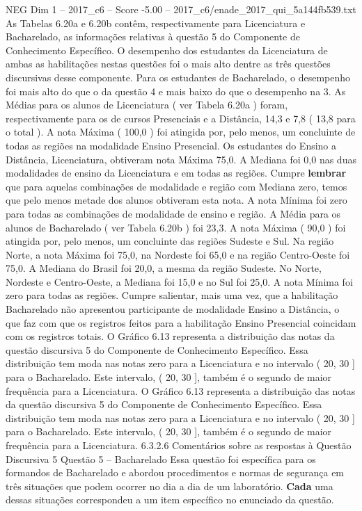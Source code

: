 \begin{textsample}{NEG Dim 1 – 2017\_c6 – Score -5.00 – 2017\_c6/enade\_2017\_qui\_5a144fb539.txt}
As Tabelas 6.20a e 6.20b contêm, respectivamente para Licenciatura e Bacharelado, as informações relativas à questão 5 do Componente de Conhecimento Específico.
O desempenho dos estudantes da Licenciatura de ambas as habilitações nestas questões foi o mais alto dentre as três questões discursivas desse componente.
Para os estudantes de Bacharelado, o desempenho foi mais alto do que o da questão 4 e mais baixo do que o desempenho na 3.
As Médias para os alunos de Licenciatura ( ver Tabela 6.20a ) foram, respectivamente para os de cursos Presenciais e a Distância, 14,3 e 7,8 ( 13,8 para o total ).
A nota Máxima ( 100,0 ) foi atingida por, pelo menos, um concluinte de todas as regiões na modalidade Ensino Presencial.
Os estudantes do Ensino a Distância, Licenciatura, obtiveram nota Máxima 75,0.
A Mediana foi 0,0 nas duas modalidades de ensino da Licenciatura e em todas as regiões.
Cumpre \textbf{lembrar} que para aquelas combinações de modalidade e região com Mediana zero, temos que pelo menos metade dos alunos obtiveram esta nota.
A nota Mínima foi zero para todas as combinações de modalidade de ensino e região.
A Média para os alunos de Bacharelado ( ver Tabela 6.20b ) foi 23,3.
A nota Máxima ( 90,0 ) foi atingida por, pelo menos, um concluinte das regiões Sudeste e Sul.
Na região Norte, a nota Máxima foi 75,0, na Nordeste foi 65,0 e na região Centro-Oeste foi 75,0.
A Mediana do Brasil foi 20,0, a mesma da região Sudeste.
No Norte, Nordeste e Centro-Oeste, a Mediana foi 15,0 e no Sul foi 25,0.
A nota Mínima foi zero para todas as regiões.
Cumpre salientar, mais uma vez, que a habilitação Bacharelado não apresentou participante de modalidade Ensino a Distância, o que faz com que os registros feitos para a habilitação Ensino Presencial coincidam com os registros totais.
O Gráfico 6.13 representa a distribuição das notas da questão discursiva 5 do Componente de Conhecimento Específico.
Essa distribuição tem moda nas notas zero para a Licenciatura e no intervalo ( 20, 30 ] para o Bacharelado.
Este intervalo, ( 20, 30 ], também é o segundo de maior frequência para a Licenciatura.
O Gráfico 6.13 representa a distribuição das notas da questão discursiva 5 do Componente de Conhecimento Específico.
Essa distribuição tem moda nas notas zero para a Licenciatura e no intervalo ( 20, 30 ] para o Bacharelado.
Este intervalo, ( 20, 30 ], também é o segundo de maior frequência para a Licenciatura. 6.3.2.6 Comentários sobre as respostas à Questão Discursiva 5 Questão 5 – Bacharelado Essa questão foi específica para os formandos de Bacharelado e abordou procedimentos e normas de segurança em três situações que podem ocorrer no dia a dia de um laboratório. \textbf{Cada} uma dessas situações correspondeu a um item específico no enunciado da questão.

\end{textsample}
